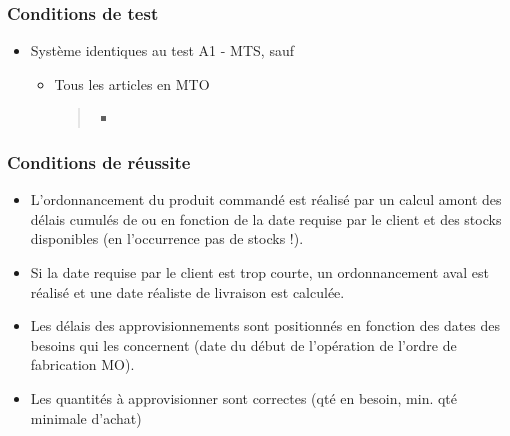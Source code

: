 \documentclass[letterpaper,10pt,french]{sphinxmanual}
\begin{document}
\subsubsection{Conditions de test}
\label{\detokenize{readthedocs/tests/C1_MPS:conditions-de-test}}\begin{itemize}
\item {} 
Système identiques au test A1 - MTS, sauf
\begin{itemize}
\item {} 
Tous les articles en MTO
\begin{quote}

\begin{figure}[htbp]
\centering

\noindent{}
\end{figure}
\begin{itemize}
\item {} 

\end{itemize}
\end{quote}

\end{itemize}

\end{itemize}


\subsubsection{Conditions de réussite}
\label{\detokenize{readthedocs/tests/C1_MPS:conditions-de-reussite}}\begin{itemize}
\item {} 
L’ordonnancement du produit commandé est réalisé par un calcul amont des délais cumulés de  ou  en fonction de la date requise par le client et des stocks disponibles (en l’occurrence pas de stocks !).

\item {} 
Si la date requise par le client est trop courte, un ordonnancement aval est réalisé et une date réaliste de livraison est calculée.

\item {} 
Les délais des approvisionnements sont positionnés en fonction des dates des besoins qui les concernent (date du début de l’opération de l’ordre de fabrication MO).

\item {} 
Les quantités à approvisionner sont correctes (qté en besoin, min. qté minimale d’achat)

\end{itemize}
\end{document}

